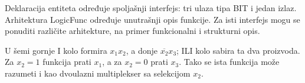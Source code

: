 Deklaracija entiteta određuje spoljašnji interfejs: tri ulaza tipa BIT i jedan izlaz. Arhitektura LogicFunc određuje unutrašnji opis funkcije. Za isti interfejs mogu se ponuditi različite arhitekture, na primer funkcionalni i strukturni opis.

U šemi gornje I kolo formira \(x_1x_2\), a donje \(\overline{x_2}x_3\); ILI kolo sabira ta dva proizvoda. Za \(x_2=1\) funkcija prati \(x_1\), a za \(x_2=0\) prati \(x_3\). Tako se ista funkcija može razumeti i kao dvoulazni multiplekser sa selekcijom \(x_2\).
